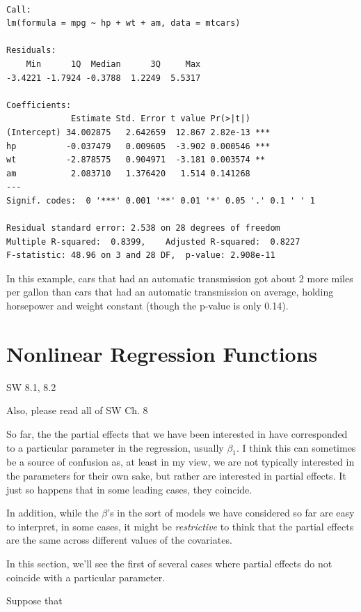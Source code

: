 \documentclass[
  letterpaper,
  DIV=11,
  numbers=noendperiod]{scrreprt}
\begin{document}
\begin{verbatim}

Call:
lm(formula = mpg ~ hp + wt + am, data = mtcars)

Residuals:
    Min      1Q  Median      3Q     Max 
-3.4221 -1.7924 -0.3788  1.2249  5.5317 

Coefficients:
             Estimate Std. Error t value Pr(>|t|)    
(Intercept) 34.002875   2.642659  12.867 2.82e-13 ***
hp          -0.037479   0.009605  -3.902 0.000546 ***
wt          -2.878575   0.904971  -3.181 0.003574 ** 
am           2.083710   1.376420   1.514 0.141268    
---
Signif. codes:  0 '***' 0.001 '**' 0.01 '*' 0.05 '.' 0.1 ' ' 1

Residual standard error: 2.538 on 28 degrees of freedom
Multiple R-squared:  0.8399,    Adjusted R-squared:  0.8227 
F-statistic: 48.96 on 3 and 28 DF,  p-value: 2.908e-11
\end{verbatim}

In this example, cars that had an automatic transmission got about 2
more miles per gallon than cars that had an automatic transmission on
average, holding horsepower and weight constant (though the p-value is
only 0.14).

\section{Nonlinear Regression
Functions}\label{nonlinear-regression-functions}

SW 8.1, 8.2

Also, please read all of SW Ch. 8

So far, the the partial effects that we have been interested in have
corresponded to a particular parameter in the regression, usually
\(\beta_1\). I think this can sometimes be a source of confusion as, at
least in my view, we are not typically interested in the parameters for
their own sake, but rather are interested in partial effects. It just so
happens that in some leading cases, they coincide.

In addition, while the \(\beta\)'s in the sort of models we have
considered so far are easy to interpret, in some cases, it might be
\emph{restrictive} to think that the partial effects are the same across
different values of the covariates.

In this section, we'll see the first of several cases where partial
effects do not coincide with a particular parameter.

Suppose that
\end{document}

